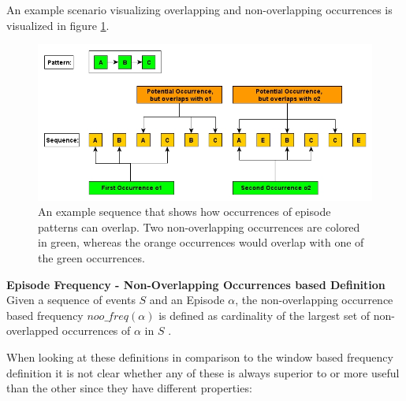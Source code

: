 An example scenario visualizing overlapping and non-overlapping occurrences is visualized in figure \ref{fig_nonOverlappingExample}.


\begin{figure}[h]
	\centering
  	\includegraphics[width=\textwidth]{nonOverlappingExample}
	\caption[Overlapping Episode Occurrences]{An example sequence that shows how occurrences of episode patterns can overlap. Two non-overlapping occurrences are colored in green, whereas the orange occurrences would overlap with one of the green occurrences.}
	\label{fig_nonOverlappingExample}
\end{figure}

\begin{mydef}
\label{def_nonOverlappingFrequency}
\textbf{Episode Frequency - Non-Overlapping Occurrences based Definition} Given a sequence of events $S$ and an Episode $\alpha$, the non-overlapping occurrence based frequency $noo\_freq(\alpha )$ is defined as cardinality of the largest set of non-overlapped occurrences of $\alpha$ in $S$ \cite{laxman2007fast}.
\end{mydef}


When looking at these definitions in comparison to the window based frequency definition it is not clear whether any of these is always superior to or more useful than the other since they have different properties:

